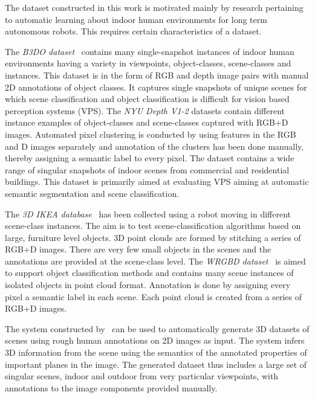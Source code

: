 \documentclass[letterpaper, 10 pt, conference]{ieeeconf}  %
\begin{document}
The dataset constructed in this work is motivated mainly by research pertaining to automatic learning about indoor human environments for 
long term autonomous robots. This requires certain characteristics of a dataset.

The \textit{B3DO dataset}~\cite{Janoch:ICCV2011} contains many single-snapshot instances of indoor human 
environments having a variety in viewpoints, object-classes, scene-classes and instances. This dataset is in the form of RGB and depth image 
pairs with manual 2D annotations of object classes. It captures single snapshots of unique scenes for which scene classification and object 
classification is difficult for vision based perception systems (VPS).
The \textit{NYU Depth V1-2}\cite{Silberman:ECCV2012} datasets contain different instance examples of object-classes and scene-classes 
captured with RGB+D images. Automated pixel clustering is conducted by using features in the RGB and D images separately and annotation of 
the clusters has been done manually, thereby assigning a semantic label to every pixel. The dataset contains a wide range of singular 
snapshots of indoor scenes from commercial and residential buildings. This dataset is primarily aimed at evaluating VPS aiming at automatic 
semantic segmentation and scene classification.

The \textit{3D IKEA database}~\cite{Swadzba:RAS2012} has been collected using a robot moving in different scene-class instances. The 
aim is to test scene-classification algorithms based on large, furniture level objects. 3D point clouds are formed by 
stitching a series of RGB+D images. There are very few small objects in the scenes and the annotations are provided at the 
scene-class level. The \textit{WRGBD dataset}~\cite{Lai:ICRA2011} is aimed to support object classification methods and contains many scene 
instances of isolated objects in point cloud format. Annotation is done by assigning every pixel a semantic label in each scene. Each point 
cloud is created from a series of RGB+D images.

The system constructed by~\cite{Russell:CVPR2009} can be used to automatically generate 3D datasets of scenes using rough human annotations 
on 2D images as input. The system infers 3D information from the scene using the semantics of the annotated properties of important planes 
in the image. The generated dataset thus includes a large set of singular scenes, indoor and outdoor from very particular viewpoints, with 
annotations to the image components provided manually.
\end{document}
